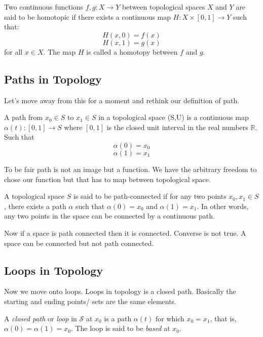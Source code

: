 \documentclass{article}
\begin{document}
\begin{theorem}
    Two continuous functions \( f, g: X \rightarrow Y \) between topological spaces \( X \) and \( Y \) are said to be homotopic if there exists a continuous map \( H: X \times [0,1] \rightarrow Y \) such that:
\[ H(x, 0) = f(x) \]
\[ H(x, 1) = g(x) \]
for all \( x \in X \). The map \( H \) is called a homotopy between \( f \) and \( g \).
\end{theorem}

\subsection{Paths in Topology}

Let's move away from this for a moment and rethink our definition of path. 
\begin{theorem}
    A path from \( x_0 \in S \) to \( x_1 \in S \) in a topological space (S,U) is a continuous map \( \alpha(t): [0,1] \to S \) where \([0, 1]\) is the closed unit interval in the real numbers \(\mathbb{R}\). Such that 
    \[ \alpha(0) = x_0 \]
    \[ \alpha(1) = x_1\]
\end{theorem}

To be fair path is not an image but a function. We have the arbitrary freedom to chose our function but that has to map between topological space. 

\begin{theorem}
    A topological space \( S \) is said to be path-connected if for any two points \( x_0, x_1 \in S \), there exists a path \(\alpha\) such that \(\alpha(0) = x_0\) and \(\alpha(1) = x_1\). In other words, any two points in the space can be connected by a continuous path.
\end{theorem}

Now if a space is path connected then it is connected. Converse is not true. A space can be connected but not path connected. 

\subsection{Loops in Topology}
Now we move onto loops. Loops in topology is a closed path. Basically the starting and ending points/ sets are the same elements. 

\begin{theorem}
A \textit{closed path} or \textit{loop} in \(\mathcal{S}\) at \(x_0\) is a path \(\alpha(t)\) for which \(x_0 = x_1\), that is, \(\alpha(0) = \alpha(1) = x_0\). The loop is said to be \textit{based} at \(x_0\).
\end{theorem}
\end{document}
